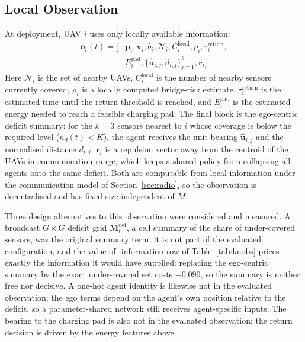 \documentclass[conference]{IEEEtran}
\begin{document}
\subsection{Local Observation}
At deployment, UAV $i$ uses only locally available information:
\begin{equation}
\begin{split}
\mathbf o_i(t)=\bigl[&\mathbf p_i,\mathbf v_i,b_i,\mathcal N_i,C_i^{\mathrm{local}},\rho_i,\tau_i^{\mathrm{return}},\\
&E_i^{\mathrm{pad}},\{\hat{\mathbf u}_{i,j},d_{i,j}\}_{j=1}^{k},\mathbf r_i\bigr].
\end{split}
\label{eq:obs}
\end{equation}
Here $\mathcal N_i$ is the set of nearby UAVs, $C_i^{\mathrm{local}}$ is the number of nearby sensors currently covered, $\rho_i$ is a locally computed bridge-risk estimate, $\tau_i^{\mathrm{return}}$ is the estimated time until the return threshold is reached, and $E_i^{\mathrm{pad}}$ is the estimated energy needed to reach a feasible charging pad.  The final block is the ego-centric deficit summary: for the $k=3$ sensors nearest to $i$ whose coverage is below the required level ($n_d(t)<K$), the agent receives the unit bearing $\hat{\mathbf u}_{i,j}$ and the normalised distance $d_{i,j}$; $\mathbf r_i$ is a repulsion vector away from the centroid of the UAVs in communication range, which keeps a shared policy from collapsing all agents onto the same deficit.  Both are computable from local information under the communication model of Section~\ref{sec:radio}, so the observation is decentralised and has fixed size independent of $M$.

Three design alternatives to this observation were considered and measured.
A broadcast $G\times G$ deficit grid $\mathbf M_t^{\mathrm{def}}$, a cell
summary of the share of under-covered sensors, was the original summary
term; it is not part of the evaluated configuration, and the value-of-
information row of Table~\ref{tab:knobs} prices exactly the information it
would have supplied: replacing the ego-centric summary by the exact
under-covered set costs $-0.090$, so the summary is neither free nor
decisive.  A one-hot agent identity is likewise not in the evaluated
observation; the ego terms depend on the agent's own position relative to the
deficit, so a parameter-shared network still receives agent-specific inputs.
The bearing to the charging pad is also not in the evaluated observation; the
return decision is driven by the energy features above.
\end{document}
